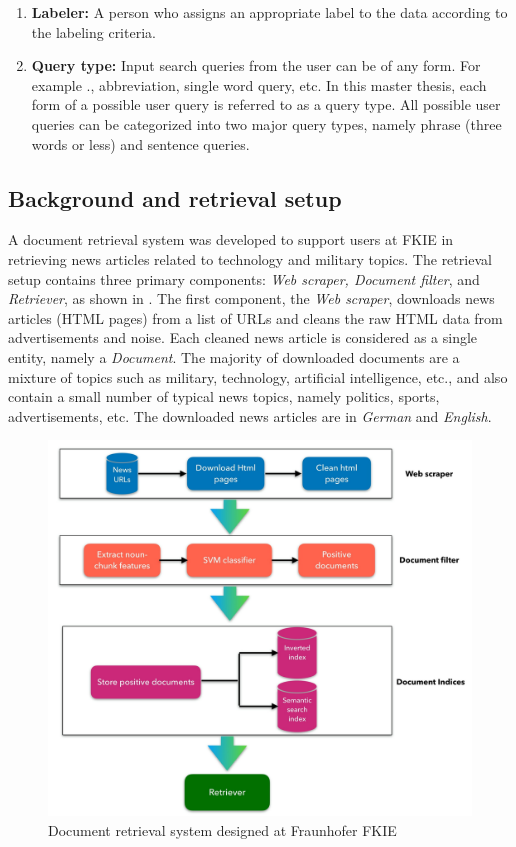 \documentclass[master,proposal,extern,palatino]{rgseThesis}
\begin{document}
\begin{enumerate}
	\item{\textbf{Labeler:}} A person who assigns an appropriate label to the data according to the labeling criteria.
	
	\item{\textbf{Query type:}} Input search queries from the user can be of any form. For example ., abbreviation, single word query, etc. In this master thesis, each form of a possible user query is referred to as a query type. All possible user queries can be categorized into two major query types, namely phrase (three words or less) and sentence queries.
	
\end{enumerate}	


\subsection{Background and retrieval setup}

A document retrieval system was developed to support users at FKIE in retrieving news articles  related to technology and military topics. The retrieval setup contains three primary components:  \textit{Web scraper, Document filter}, and \textit{Retriever}, as shown in . The first component, the \textit{Web scraper}, downloads news articles (HTML pages) from a list of URLs and cleans the raw HTML
data from advertisements and noise. Each cleaned news article is considered as a single entity, namely a \textit{Document}. The majority of  downloaded documents are a mixture of topics such as military, technology, artificial intelligence, etc., and also contain a small number of typical news topics, namely politics, sports, advertisements, etc. The downloaded news articles are in \textit{German} and \textit{English}.

\begin{figure}[h]
	\centering
	\includegraphics[width=.8\textwidth]{images/keynotes_images/background.jpg}
	\caption{Document retrieval system designed at Fraunhofer FKIE \label{fig:background_image}}
\end{figure}
\end{document}
